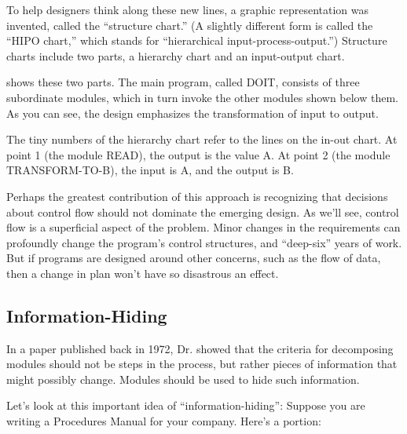 To help designers think along these new lines, a graphic
representation was invented, called the ``structure chart.''%
(A slightly different form is called the ``HIPO chart,'' which stands
for ``hierarchical input-process-output.'') Structure charts include
two parts, a hierarchy chart and an input-output chart.


 shows these two parts. The main program, called DOIT,
consists of three subordinate modules, which in turn invoke the other
modules shown below them. As you can see, the design emphasizes the
transformation of input to output. 

The tiny numbers of the hierarchy chart refer to the lines on the
in-out chart. At point 1 (the module READ), the output is the value A.
At point 2 (the module TRANSFORM-TO-B), the input is A, and the output
is B. 

Perhaps the greatest contribution of this approach is recognizing that
decisions about control flow should not dominate the emerging design.
As we'll see, control flow is a superficial aspect of the problem.
Minor changes in the requirements can profoundly change the program's
control structures, and ``deep-six'' years of work.  But if programs
are designed around other concerns, such as the flow of data, then a
change in plan won't have so disastrous an effect.%
%
%
%


\subsection{Information-Hiding }%
%
%
In a paper \cite{parnas72} published back in 1972,
Dr. %
 showed
that the criteria for decomposing modules should not be steps in the
process, but rather pieces of information that might possibly change.
Modules should be used to hide such information.

Let's look at this important idea of ``information-hiding'':
Suppose you are writing a Procedures Manual for your company.
Here's a portion:

